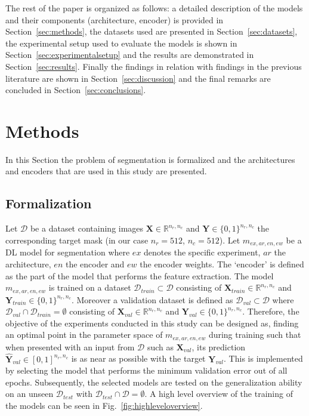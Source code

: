 \documentclass{elsarticle}
\begin{document}
The rest of the paper is organized as follows: a detailed description of the models and their components (architecture, encoder) is provided in Section~\ref{sec:methods}, the datasets used are presented in Section~\ref{sec:datasets}, the experimental setup used to evaluate the models is shown in Section~\ref{sec:experimentalsetup} and the results are demonstrated in Section~\ref{sec:results}. Finally the findings in relation with findings in the previous literature are shown in Section~\ref{sec:discussion} and the final remarks are concluded in Section~\ref{sec:conclusions}.

\section{Methods}
In this Section the problem of segmentation is formalized and the architectures and encoders that are used in this study are presented.

\label{sec:methods}
\subsection{Formalization}
Let $\mathcal{D}$ be a dataset containing images $\bm{X} \in \mathbb{R}^{n_r, n_c}$ and $\bm{Y} \in \{0, 1\}^{n_r, n_c}$ the corresponding target mask (in our case $n_r=512$, $n_c=512$).
Let $m_{ex, ar, en, ew}$ be a DL model for segmentation where $ex$ denotes the specific experiment, $ar$ the architecture, $en$ the encoder and $ew$ the encoder weights.
The `encoder' is defined as the part of the model that performs the feature extraction.
The model $m_{ex, ar, en, ew}$ is trained on a dataset $\mathcal{D}_{train}\subset\mathcal{D}$ consisting of $\bm{X}_{train} \in \mathbb{R}^{n_r, n_c}$ and $\bm{Y}_{train} \in \{0, 1\}^{n_r, n_c}$.
Moreover a validation dataset is defined as $\mathcal{D}_{val}\subset\mathcal{D}$ where $\mathcal{D}_{val}\cap\mathcal{D}_{train}=\emptyset$ consisting of $\bm{X}_{val} \in \mathbb{R}^{n_r, n_c}$ and $\bm{Y}_{val} \in \{0, 1\}^{n_r, n_c}$.
Therefore, the objective of the experiments conducted in this study can be designed as, finding an optimal point in the parameter space of $m_{ex, ar, en, ew}$ during training such that when presented with an input from $\mathcal{D}$ such as $\bm{X}_{val}$, its prediction $\hat{\bm{Y}}_{val} \in [0, 1]^{n_r, n_c}$ is as near as possible with the target $\bm{Y}_{val}$.
This is implemented by selecting the model that performs the minimum validation error out of all epochs.
Subsequently, the selected models are tested on the generalization ability on an unseen $\mathcal{D}_{test}$ with $\mathcal{D}_{test}\cap\mathcal{D}=\emptyset$.
A high level overview of the training of the models can be seen in Fig.~\ref{fig:highleveloverview}.
\end{document}
